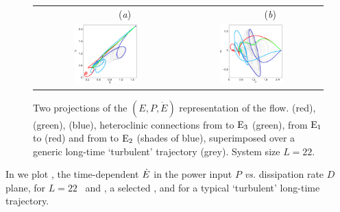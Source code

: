 \begin{figure}[t]
\begin{center}
 \begin{tabular}{cc}
        ~~~~~~~~(\textit{a})                        &   ~~~~~~~~(\textit{b}) \\
    \includegraphics[width=0.46\textwidth, clip=true]{figs_bmp/connEP.eps}     & \includegraphics[width=0.46\textwidth, clip=true]{figs_bmp/connPEdot.eps}
 \end{tabular}
\end{center}
\caption{
Two projections of the $(E,P,\dot{E})$ representation of the flow.
 (red),  (green),  (blue),
heteroclinic connections from  to $\mathrm{E}_{3}$ (green),
from $\mathrm{E}_{1}$ to  (red)
and from  to $\mathrm{E}_{2}$ (shades of blue), superimposed over
a generic long-time `turbulent' trajectory (grey).
System size $L=22$.
        }
\label{f:drivedragConn}
\end{figure}

In  we plot , the time-dependent
$\dot{E}$ in the power input $P$ {\em vs.}
dissipation rate $D$ plane, for $L=22$ \eqva\ and \reqva,
a selected \rpo, and for a typical `turbulent' long-time
trajectory.

